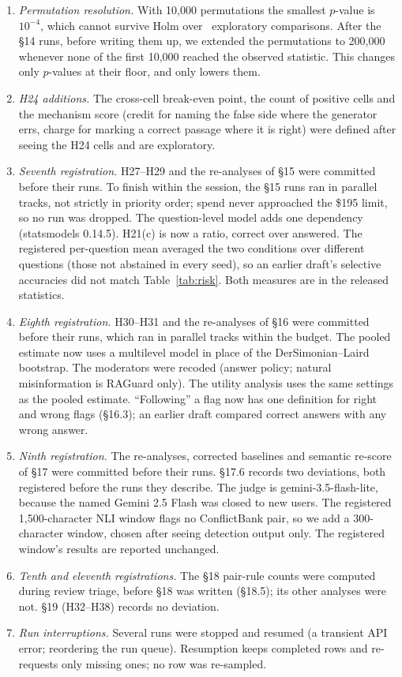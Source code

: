 \begin{enumerate}[leftmargin=*,itemsep=1pt,topsep=2pt]
ran at its default, and as a detector its JSON goes to the regex fallback. The answer
parser unwraps paired tags (\texttt{<answer>X</answer>}), a format no earlier result contained.
\item \emph{Permutation resolution.} With 10,000 permutations the smallest $p$-value is $10^{-4}$, which cannot
survive Holm over \nExploratory\ exploratory comparisons. After the \S14 runs, before writing them up, we
extended the permutations to 200,000 whenever none of the first 10,000 reached the observed statistic. This changes
only $p$-values at their floor, and only lowers them.
\item \emph{H24 additions.} The cross-cell break-even point, the count of positive cells and the mechanism score
(credit for naming the false side where the generator errs, charge for marking a correct passage where it is right)
were defined after seeing the H24 cells and are exploratory.
\item \emph{Seventh registration.} H27--H29 and the re-analyses of \S15 were committed before their runs. To finish
within the session, the \S15 runs ran in parallel tracks, not strictly in priority order; spend never
approached the \$195 limit, so no run was dropped. The question-level model adds one dependency (statsmodels 0.14.5).
H21(c) is now a ratio, correct over answered. The registered per-question mean averaged the two conditions
over different questions (those not abstained in every seed), so an earlier draft's selective accuracies did
not match Table~\ref{tab:risk}. Both measures are in the released statistics.
\item \emph{Eighth registration.} H30--H31 and the re-analyses of \S16 were committed before their runs, which
ran in parallel tracks within the budget. The pooled estimate now uses a multilevel model in place of the
DerSimonian--Laird bootstrap. The moderators were recoded (answer policy; natural misinformation is RAGuard only).
The utility analysis uses the same settings as the pooled estimate. ``Following'' a flag now has one definition for
right and wrong flags (\S16.3); an earlier draft compared correct answers with any wrong answer.
\item \emph{Ninth registration.} The re-analyses, corrected baselines and semantic re-score of \S17 were committed
before their runs. \S17.6 records two deviations, both registered before the runs they describe. The judge is
gemini-3.5-flash-lite, because the named Gemini 2.5 Flash was closed to new users. The registered
1,500-character NLI window flags no ConflictBank pair, so we add a 300-character window, chosen after seeing
detection output only. The registered window's results are reported unchanged.
\item \emph{Tenth and eleventh registrations.} The \S18 pair-rule counts were computed during review triage, before
\S18 was written (\S18.5); its other analyses were not. \S19 (H32--H38) records no deviation.
\item \emph{Run interruptions.} Several runs were stopped and resumed (a transient API error; reordering the run
queue). Resumption keeps completed rows and re-requests only missing ones; no row was re-sampled.
\end{enumerate}

